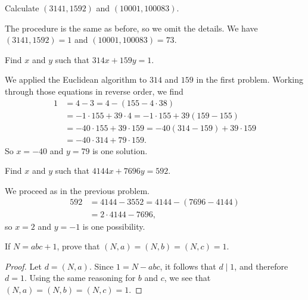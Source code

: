 Calculate $(3141, 1592)$ and $(10001, 100083)$.
\begin{solution}
  The procedure is the same as before, so we omit the details. We have
  $(3141,1592) = 1$ and $(10001, 100083) = 73$.
\end{solution}

 Find $x$ and $y$ such that $314x + 159y = 1$.
\begin{solution}
  We applied the Euclidean algorithm to $314$ and $159$ in the first
  problem. Working through those equations in reverse order, we find
  \begin{align*}
    1 &= 4 - 3 = 4 - (155 - 4\cdot38) \\
      &= -1\cdot155 + 39\cdot4 = -1\cdot155 + 39(159 - 155) \\
      &= -40\cdot155 + 39\cdot159 = -40(314 - 159) + 39\cdot159 \\
      &= -40\cdot314 + 79\cdot159.
  \end{align*}
  So $x = -40$ and $y = 79$ is one solution.
\end{solution}

 Find $x$ and $y$ such that $4144x + 7696y = 592$.
\begin{solution}
  We proceed as in the previous problem.
  \begin{align*}
    592 &= 4144 - 3552 = 4144 - (7696 - 4144) \\
        &= 2\cdot4144 - 7696,
  \end{align*}
  so $x = 2$ and $y = -1$ is one possibility.
\end{solution}

 If $N = abc + 1$, prove that $(N,a) = (N,b) = (N,c) = 1$.
\begin{proof}
  Let $d = (N,a)$. Since $1 = N - abc$, it follows that $d\mid1$, and
  therefore $d = 1$. Using the same reasoning for $b$ and $c$, we see
  that $(N,a) = (N,b) = (N,c) = 1$.
\end{proof}

